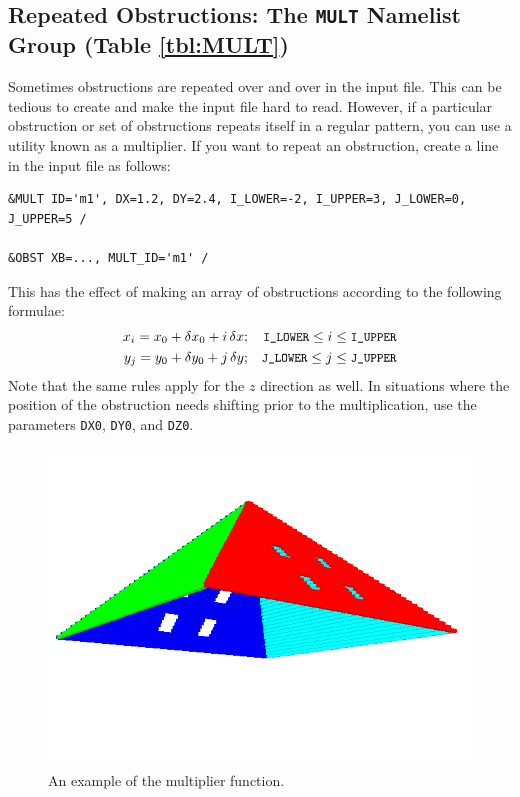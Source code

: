\documentclass[11pt]{book}
\newcommand{\ct}{\tt\small}
\newcommand{\dx}{\delta x}
\newcommand{\dy}{\delta y}
\begin{document}
\subsection{Repeated Obstructions: The \texorpdfstring{{\tt MULT}}{MULT} Namelist Group (Table \ref{tbl:MULT})}
\label{info:MULT}

Sometimes obstructions are repeated over and over in the input file. This can be tedious to create and make the input file hard to read. However,
if a particular obstruction or set of obstructions repeats itself in a regular pattern, you can use a utility known as a multiplier. If you want to
repeat an obstruction, create a line in the input file as follows:

\footnotesize
\begin{verbatim}
&MULT ID='m1', DX=1.2, DY=2.4, I_LOWER=-2, I_UPPER=3, J_LOWER=0, J_UPPER=5 /

&OBST XB=..., MULT_ID='m1' /
\end{verbatim}
\normalsize

\noindent
This has the effect of making an array of obstructions according to the following formulae:
\begin{eqnarray*}  x_i = x_0 + \dx_0 + i \, \dx  &;& \hbox{\ct I\_LOWER} \le i \le \hbox{\ct I\_UPPER} \\
                   y_j = y_0 + \dy_0 + j \, \dy  &;& \hbox{\ct J\_LOWER} \le j \le \hbox{\ct J\_UPPER}
\end{eqnarray*}
Note that the same rules apply for the $z$ direction as well. In situations where the position of the obstruction needs shifting prior to the multiplication, use the
parameters {\ct DX0}, {\ct DY0}, and {\ct DZ0}.

\begin{figure}[t]
\includegraphics[width=\textwidth]{SCRIPT_FIGURES/pyramid}
\caption{An example of the multiplier function.}
\label{fig:mult}
\end{figure}
\end{document}
